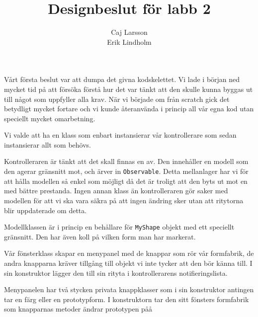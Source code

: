 \documentclass[a4paper,8pt]{article}
\begin{document}
\title{Designbeslut för labb 2}
\author{Caj Larsson\\Erik Lindholm}
\maketitle

Vårt första beslut var att dumpa det givna kodskelettet. Vi lade i början ned 
mycket tid på att försöka förstå hur det var tänkt att den skulle kunna byggas
ut till något som uppfyller alla krav. När vi började om från scratch gick det
betydligt mycket fortare och vi kunde återanvända i princip all vår egna kod 
utan speciellt mycket omarbetning.

Vi valde att ha en klass som enbart instansierar vår kontrollerare som sedan
instansierar allt som behövs.

Kontrolleraren är tänkt att det skall finnas en av. Den innehåller en modell
som den agerar gränsnitt mot, och ärver in \texttt{Observable}. Detta 
mellanlager har vi för att hålla modellen så enkel som möjligt då det är 
troligt att den byts ut mot en med bättre prestanda. Ingen annan klass än 
kontrolleraren gör saker med modellen för att vi ska vara säkra på att ingen
ändring sker utan att ritytorna blir uppdaterade om detta.

Modellklassen är i princip en behållare för \texttt{MyShape} objekt med ett
speciellt gränsnitt. Den har även koll på vilken form man har markerat.

Vår fönsterklass skapar en menypanel med de knappar som rör vår formfabrik, de
andra knapparna kräver tillgång till objekt vi inte tycker att den bör 
känna till. I sin konstruktor lägger den till sin rityta i kontrollerarens 
notifieringslista.

Menypanelen har två stycken privata knappklasser som i sin konstruktor antingen
tar en färg eller en prototypform. I konstruktorn tar den sitt fönsters 
formfabrik som knapparnas metoder ändrar prototypen påå 
\end{document}
